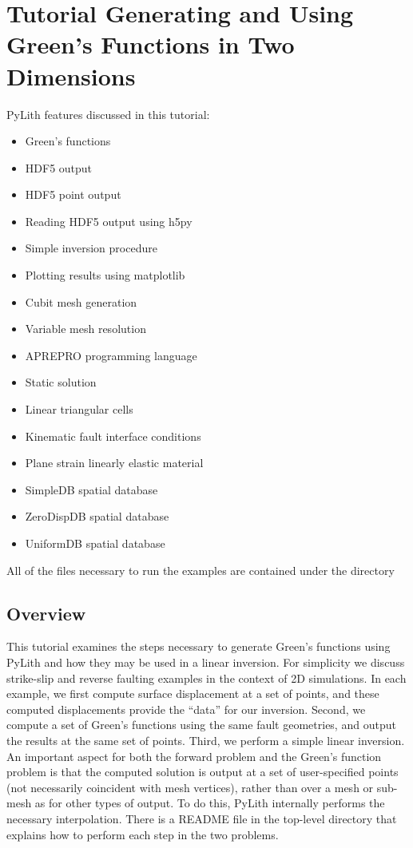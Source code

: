 \section{Tutorial Generating and Using Green's Functions in Two Dimensions}
\label{sec:example:greensfns2d}

PyLith features discussed in this tutorial:
\begin{itemize}
\item Green's functions
\item HDF5 output
\item HDF5 point output
\item Reading HDF5 output using h5py
\item Simple inversion procedure
\item Plotting results using matplotlib
\item Cubit mesh generation
\item Variable mesh resolution
\item APREPRO programming language
\item Static solution
\item Linear triangular cells
\item Kinematic fault interface conditions
\item Plane strain linearly elastic material
\item SimpleDB spatial database
\item ZeroDispDB spatial database
\item UniformDB spatial database
\end{itemize}
All of the files necessary to run the examples are contained under the
directory 


\subsection{Overview}

This tutorial examines the steps necessary to generate Green's
functions using PyLith and how they may be used in a linear
inversion. For simplicity we discuss strike-slip and reverse faulting
examples in the context of 2D simulations. In each example, we first
compute surface displacement at a set of points, and these computed
displacements provide the ``data'' for our inversion. Second, we
compute a set of Green's functions using the same fault geometries,
and output the results at the same set of points. Third, we perform a
simple linear inversion. An important aspect for both the forward
problem and the Green's function problem is that the computed solution
is output at a set of user-specified points (not necessarily
coincident with mesh vertices), rather than over a mesh or sub-mesh as
for other types of output. To do this, PyLith internally performs the
necessary interpolation. There is a README file in the top-level
directory that explains how to perform each step in the two problems.


